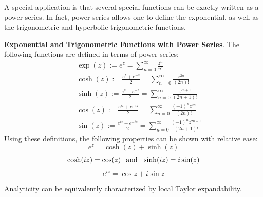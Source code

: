 A special application is that several special functions can be exactly written as a power series. In fact, power series allows one to define the exponential, as well as the trigonometric and hyperbolic trigonometric functions.

\begin{shaded}
    \textbf{Exponential and Trigonometric Functions with Power Series}. The following functions are defined in terms of power series: 
    \begin{eqnarray*}
        &&\exp(z) := e^z = \sum_{n=0}^\infty \frac{z^n}{n!}\\
        &&\cosh(z) := \frac{e^z + e^{-z}}{2} = \sum_{n=0}^\infty \frac{z^{2n}}{(2n)!}\\
        &&\sinh(z) := \frac{e^z -e^{-z}}{2} = \sum_{n=0}^\infty \frac{z^{2n+1}}{(2n+1)!}\\
        &&\cos(z) := \frac{e^{iz} + e^{-iz}}{2} = \sum_{n=0}^\infty \frac{(-1)^n z^{2n}}{(2n)!}\\
        &&\sin(z) := \frac{e^{iz}-e^{-iz}}{2} = \sum_{n=0}^\infty \frac{(-1)^{n}z^{2n+1}}{(2n+1)!}
    \end{eqnarray*} Using these definitions, the following properties can be shown with relative ease: \[e^z = \cosh(z) + \sinh(z)\] \[\cosh(iz) = \cos(z)\hspace{0.1in}\text{and}\hspace{0.1in}\sinh(iz)=i\sin(z)\] \[e^{iz} = \cos z + i\sin z\tag{Euler's Formula}\]
\end{shaded}

Analyticity can be equivalently characterized by local Taylor expandability.

